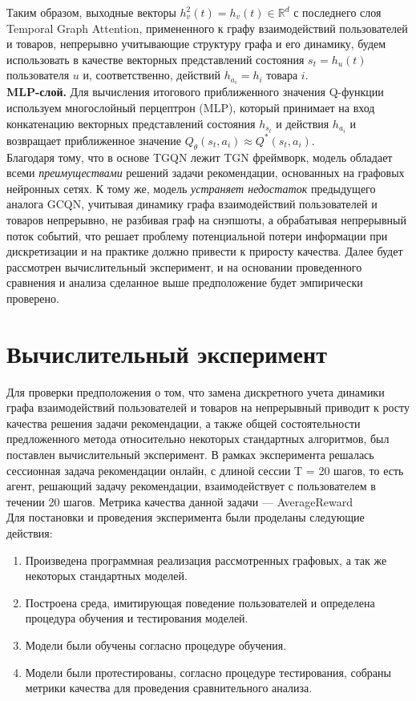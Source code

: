 \documentclass{mipt-thesis-ms}
\begin{document}
Таким образом, выходные векторы $h_v^2(t) = h_v(t) \in \mathbb{R}^d$ с последнего слоя Temporal Graph Attention, примененного к графу взаимодействий пользователей и товаров, непрерывно учитывающие структуру графа и его динамику, будем использовать в качестве векторных представлений состояния $s_t = h_u(t)$ пользователя $u$ и, соответственно, действий $h_{a_i} = h_i$ товара $i$.\\

{\bf MLP-слой.} Для вычисления итогового приближенного значения Q-функции используем многослойный перцептрон (MLP), который принимает на вход конкатенацию векторных представлений состояния $h_{s_t}$ и действия $h_{a_i}$ и возвращает приближенное значение $Q_{\theta}(s_t, a_i) \approx Q^*(s_t, a_i)$.\\


Благодаря тому, что в основе TGQN лежит TGN фреймворк, модель обладает всеми {\it преимуществами} решений задачи рекомендации, основанных на графовых нейронных сетях. К тому же, модель {\it устраняет недостаток} предыдущего аналога GCQN, учитывая динамику графа взаимодействий пользователей и товаров непрерывно, не разбивая граф на снэпшоты, а обрабатывая непрерывный поток событий, что решает проблему потенциальной потери информации при дискретизации и на практике должно привести к приросту качества. Далее будет рассмотрен вычислительный эксперимент, и на основании проведенного сравнения и анализа сделанное выше предположение будет эмпирически проверено.

\chapter{Вычислительный эксперимент}
Для проверки предположения о том, что замена дискретного учета динамики графа взаимодействий пользователей и товаров на непрерывный приводит к росту качества решения задачи рекомендации, а также общей состоятельности предложенного метода относительно некоторых стандартных алгоритмов, был поставлен вычислительный эксперимент. В рамках эксперимента решалась сессионная задача рекомендации онлайн, с длиной сессии T = 20 шагов, то есть агент, решающий задачу рекомендации, взаимодействует с пользователем в течении 20 шагов. Метрика качества данной задачи --- AverageReward\\

Для постановки и проведения эксперимента были проделаны следующие действия:
\begin{enumerate}
\item Произведена программная реализация рассмотренных графовых, а так же некоторых стандартных моделей.
\item Построена среда, имитирующая поведение пользователей и определена процедура обучения и тестирования моделей.
\item Модели были обучены согласно процедуре обучения.
\item Модели были протестированы, согласно процедуре тестирования, собраны метрики качества для проведения сравнительного анализа.
\end{enumerate}
\end{document}

